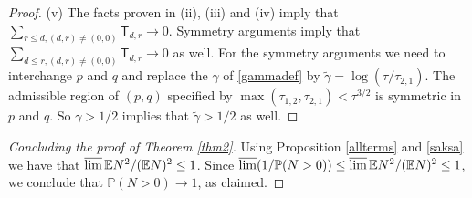 \documentclass[reqno]{amsart}
\theoremstyle{theorem}
\theoremstyle{definition}
\theoremstyle{remark}
\def\P{\mathbb{P}}
\def\E{\mathbb{E}}
\newcommand{\1}{{\text{\Large $\mathfrak 1$}}}	%
\renewcommand{\limsup}{\varlimsup}
\numberwithin{equation}{section}
\def\TTT{\mathsf T}
\begin{document}
\begin{proof}
(v) 
The facts proven in (ii), (iii) and (iv) imply that
$\sum_{r \le d, (d,r) \neq (0,0)} \TTT_{d,r} \to 0$.
Symmetry arguments imply that 
$\sum_{d \le r, (d,r) \neq (0,0)} \TTT_{d,r} \to 0$ as well.
For the symmetry arguments we need to interchange $p$ and $q$ and
replace the $\gamma$ of \eqref{gammadef} by 
$\tilde \gamma=\log (\tau/\tau_{2,1})$.
The admissible region of $(p,q)$ specified by 
$\max(\tau_{1,2}, \tau_{2,1}) < \tau^{3/2}$ is symmetric in $p$ and $q$.
So $\gamma > 1/2$ implies that $\tilde \gamma>1/2$ as well.
\end{proof}

\begin{proof}[Concluding the proof of Theorem \ref{thm2}]
Using Proposition \ref{allterms} and \eqref{saksa} we have
that $\limsup \E N^2/(\E N)^2 \le 1$.
Since $\limsup (1/\P(N>0)) \le \limsup \E N^2/(\E N)^2 \le 1$, we conclude that
$\P(N>0) \to 1$, as claimed.
\end{proof}




\end{document}
